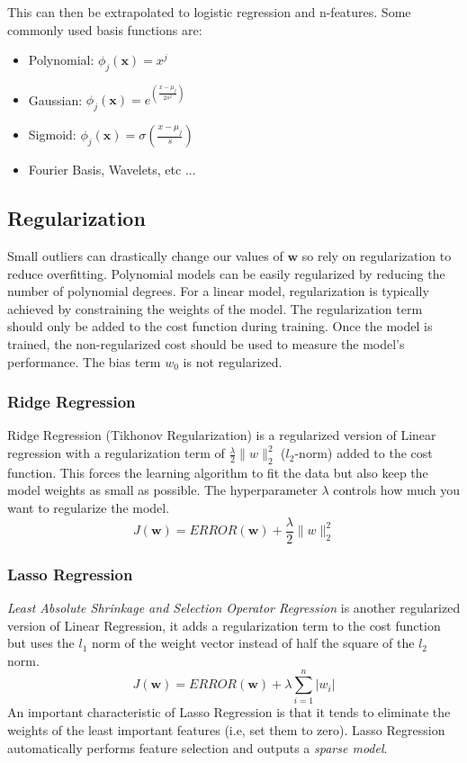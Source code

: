 \documentclass[12pt]{article}
\begin{document}
        This can then be extrapolated to logistic regression and n-features. Some commonly used basis functions are:

        \begin{itemize}
            \item Polynomial: $\phi_j(\boldsymbol{x}) = x^j$
            \item Gaussian: $\phi_j(\boldsymbol{x}) = e^{(\frac{x-\mu_j}{2s^2})}$
            \item Sigmoid: $\phi_j(\boldsymbol{x}) = \sigma{(\frac{x-\mu_j}{s})}$
            \item Fourier Basis, Wavelets, etc ...
        \end{itemize}

    \subsection{Regularization}
        Small outliers can drastically change our values of $\boldsymbol{w}$ so rely on regularization to reduce overfitting. Polynomial models can be easily regularized
        by reducing the number of polynomial degrees. For a linear model, regularization is typically achieved by constraining the weights of the model. The regularization term should only
        be added to the cost function during training. Once the model is trained, the non-regularized cost should be used to measure the model's performance. The bias term $w_0$ is not regularized.

        \subsubsection{Ridge Regression}
        Ridge Regression (Tikhonov Regularization) is a regularized version of Linear regression with a regularization term of $\frac{\lambda}{2}\|w\|_2^2$ ($l_2$-norm) added to the cost function.
        This forces the learning algorithm to fit the data but also keep the model weights as small as possible. The hyperparameter $\lambda$ controls how much you want to regularize the model.
        $$ J(\boldsymbol{w}) = ERROR(\boldsymbol{w}) + \frac{\lambda}{2}\|w\|^2_2 $$

        \subsubsection{Lasso Regression}
            \textit{Least Absolute Shrinkage and Selection Operator Regression} is another regularized version of Linear Regression, it adds a regularization term to the cost function
            but uses the $l_1$ norm of the weight vector instead of half the square of the $l_2$ norm.
            $$ J(\boldsymbol{w}) = ERROR(\boldsymbol{w}) + \lambda\sum_{i=1}^n|w_i| $$
            An important characteristic of Lasso Regression is that it tends to eliminate the weights of the least important features (i.e, set them to zero). Lasso Regression automatically performs 
            feature selection and outputs a \textit{sparse model}.
\end{document}

